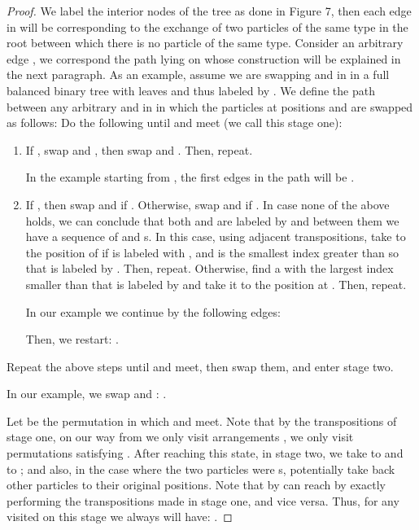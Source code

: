 \documentclass[10 pt]{article}
\begin{document}
\begin{proof}

We label the interior nodes of the tree as done in Figure 7, then each edge in  will be corresponding to the exchange
of two particles of the same type in the root between which there is no particle of the same type.
Consider an arbitrary edge , we correspond the path  lying on 
whose construction will be explained in the next paragraph. As an example,  assume we are swapping  and  in 
in a full balanced binary tree with  leaves and thus labeled by . We  define the path between any arbitrary
 and  in  in which the particles at positions  and  are swapped as follows: 
Do the following until  and  meet (we call this stage one):
\begin{enumerate}
\item If , swap  and , then swap  and . Then, repeat. 

In the example starting from , the first edges in the path will be
. 
\item If , then swap  and  if  .
Otherwise, swap  and  if  . In case none of the above holds,
we can conclude that both  and  are labeled by  and between them we have a sequence of  and s.
In this case, using adjacent transpositions, take    to the position of  if  is labeled with ,
and  is the smallest index greater than  so that  is labeled by . Then, repeat. Otherwise, find a 
with the largest index smaller than  that is labeled by  and take it to the position at . Then, repeat. 

In our example we continue by the following edges: 


Then, we restart: .
\end{enumerate}

Repeat the above steps until  and  meet, then swap them, and enter stage two.

In our example, we swap  and :   .

\medskip

Let  be the permutation in which  and  meet. Note that by the transpositions of stage one, on our way from
 we only visit arrangements , we only visit permutations  satisfying .
After reaching this state, in stage two, we take   to   and  to ; and also, in the case where the two particles
were s, potentially take back other particles to their original positions. Note that by   can reach  by exactly performing the transpositions 
 made in stage one, and vice versa. 
Thus, for any   visited on this stage we always will have: .

\smallskip


\end{proof}
\end{document}
